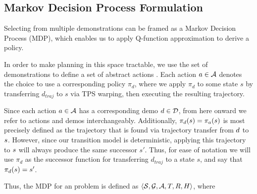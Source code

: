 
\subsection{Markov Decision Process Formulation}
\label{subsec:form_mdp}

Selecting from multiple demonstrations can be framed as a Markov Decision
Process (MDP), which enables us to apply Q-function approximation to derive a
policy.

In order to make planning in this space tractable, we use the set of
demonstrations \demoset{} to define a set of abstract actions \actionset{}. Each
action $a \in \mathcal{A}$ denotes the choice to use a corresponding
policy $\pi_d$, where we apply $\pi_d$ to some state $s$ by transferring
$d_{traj}$ to $s$ via TPS warping, then executing the resulting trajectory.

Since each action $a \in \mathcal{A}$ has a corresponding demo $d
\in \mathcal{D}$, from here onward we refer to actions and demos
interchangeably. Additionally, $\pi_{d}(s) =
\pi_{a}(s)$ is most precisely defined as the trajectory that is
found via trajectory transfer from $d$ to $s$. However, since our
transition model is deterministic, applying this trajectory to $s$ will
always produce the same successor $s'$. Thus, for ease of notation we will use
$\pi_{d}$ as the successor function for transferring $d_{traj}$ to a state $s$,
and say that $\pi_{d}(s) = s'$.

Thus, the MDP for an \mmql{} problem is defined as
$\langle\mathcal{S},\mathcal{G},\mathcal{A},T,R,H\rangle$, where

